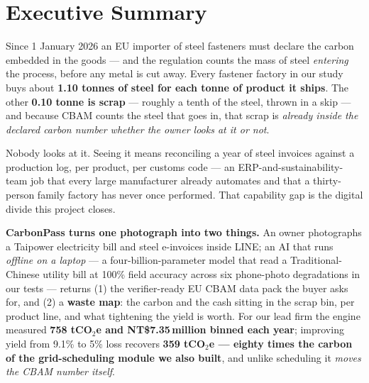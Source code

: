 \documentclass[11pt,a4paper]{article}
\newcommand{\NT}{NT\$}
\begin{document}
\thispagestyle{plain}
{\hypersetup{linkcolor=ink}\tableofcontents}
\clearpage

\section*{Executive Summary}

Since 1 January 2026 an EU importer of steel fasteners must declare the carbon embedded in the goods --- and the regulation counts the mass of steel \emph{entering} the process, before any metal is cut away\cite{qa}. Every fastener factory in our study buys about \textbf{1.10 tonnes of steel for each tonne of product it ships}. The other \textbf{0.10 tonne is scrap} --- roughly a tenth of the steel, thrown in a skip --- and because CBAM counts the steel that goes in, that scrap is \emph{already inside the declared carbon number whether the owner looks at it or not}.

Nobody looks at it. Seeing it means reconciling a year of steel invoices against a production log, per product, per customs code --- an ERP-and-sustainability-team job that every large manufacturer already automates and that a thirty-person family factory has never once performed. That capability gap is the digital divide this project closes.

\textbf{CarbonPass turns one photograph into two things.} An owner photographs a Taipower electricity bill and steel e-invoices inside LINE; an AI that runs \emph{offline on a laptop} --- a four-billion-parameter model that read a Traditional-Chinese utility bill at 100\% field accuracy across six phone-photo degradations in our tests\cite{repo} --- returns (1) the verifier-ready EU CBAM data pack the buyer asks for, and (2) a \textbf{waste map}: the carbon and the cash sitting in the scrap bin, per product line, and what tightening the yield is worth. For our lead firm the engine measured \textbf{758 tCO$_2$e and \NT7.35\,million binned each year}; improving yield from 9.1\% to 5\% loss recovers \textbf{359 tCO$_2$e --- eighty times the carbon of the grid-scheduling module we also built}, and unlike scheduling it \emph{moves the CBAM number itself}\cite{repo}.
\end{document}
